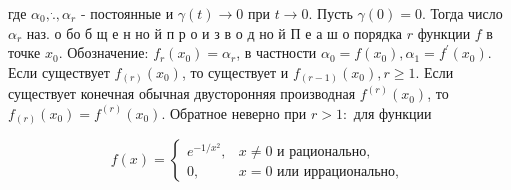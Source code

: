 \documentclass[10pt]{article}
\begin{document}
где $\alpha_{0}, \dot{.}, \alpha_{r}$ - постоянные и $\gamma(t) \rightarrow 0$ при $t \rightarrow 0$. Пусть $\gamma(0)=0$. Тогда число $\alpha_{r}$ наз. о бо б щ е н но й п р о и з в о д но й П е а ш о порядка $r$ функции $f$ в точке $x_{0}$. Обозначение: $f_{r}\left(x_{0}\right)=\alpha_{r}$, в частности $\alpha_{0}=f\left(x_{0}\right), \alpha_{1}=f^{\prime}\left(x_{0}\right)$. Если существует $f_{(r)}\left(x_{0}\right)$, то существует и $f_{(r-1)}\left(x_{0}\right), r \geqslant 1$. Если существует конечная обычная двусторонняя производная $f^{(r)}\left(x_{0}\right)$, то $f_{(r)}\left(x_{0}\right)=f^{(r)}\left(x_{0}\right)$. Обратное неверно при $r>1:$ для функции

\[
f(x)= \begin{cases}e^{-1 / x^{2}}, & x \neq 0 \text { и рационально, } \\ 0, & x=0 \text { или иррационально, }\end{cases}
\]
\end{document}
